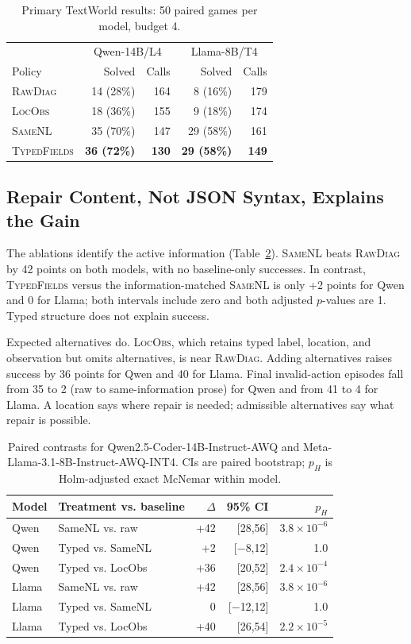 \documentclass[sigconf,review,anonymous]{acmart}
\newcommand{\rawdiag}{\textsc{RawDiag}\xspace}
\newcommand{\samenl}{\textsc{SameNL}\xspace}
\newcommand{\locobs}{\textsc{LocObs}\xspace}
\newcommand{\typedfields}{\textsc{TypedFields}\xspace}
\begin{document}
\begin{table}[t]
\caption{Primary TextWorld results: 50 paired games per model, budget 4.}
\label{tab:primary}
\small
\begin{tabular}{@{}lrrrr@{}}
\toprule
& \multicolumn{2}{c}{Qwen-14B/L4} & \multicolumn{2}{c}{Llama-8B/T4} \\
Policy & Solved & Calls & Solved & Calls \\
\midrule
\rawdiag & 14 (28\%) & 164 & 8 (16\%) & 179 \\
\locobs & 18 (36\%) & 155 & 9 (18\%) & 174 \\
\samenl & 35 (70\%) & 147 & 29 (58\%) & 161 \\
\typedfields & \textbf{36 (72\%)} & \textbf{130} & \textbf{29 (58\%)} & \textbf{149} \\
\bottomrule
\end{tabular}
\end{table}

\subsection{Repair Content, Not JSON Syntax, Explains the Gain}

The ablations identify the active information (Table~\ref{tab:causal}).
\samenl beats \rawdiag by 42 points on both models, with no baseline-only
successes. In contrast, \typedfields versus the information-matched \samenl is
only +2 points for Qwen and 0 for Llama; both intervals include zero and both
adjusted $p$-values are 1. Typed structure does not explain success.

Expected alternatives do. \locobs, which retains typed label, location, and
observation but omits alternatives, is near \rawdiag. Adding alternatives raises
success by 36 points for Qwen and 40 for Llama. Final invalid-action episodes
fall from 35 to 2 (raw to same-information prose) for Qwen and from 41 to 4 for
Llama. A location says where repair is needed; admissible alternatives say what
repair is possible.

\begin{table}[t]
\caption{Paired contrasts for Qwen2.5-Coder-14B-Instruct-AWQ and
Meta-Llama-3.1-8B-Instruct-AWQ-INT4. CIs are paired bootstrap; $p_H$ is
Holm-adjusted exact McNemar within model.}
\label{tab:causal}
\small
\begin{tabular}{@{}llrrr@{}}
\toprule
Model & Treatment vs. baseline & $\Delta$ & 95\% CI & $p_H$ \\
\midrule
Qwen & SameNL vs. raw & +42 & [28,56] & $3.8\!\times\!10^{-6}$ \\
Qwen & Typed vs. SameNL & +2 & [$-$8,12] & 1.0 \\
Qwen & Typed vs. LocObs & +36 & [20,52] & $2.4\!\times\!10^{-4}$ \\
Llama & SameNL vs. raw & +42 & [28,56] & $3.8\!\times\!10^{-6}$ \\
Llama & Typed vs. SameNL & 0 & [$-$12,12] & 1.0 \\
Llama & Typed vs. LocObs & +40 & [26,54] & $2.2\!\times\!10^{-5}$ \\
\bottomrule
\end{tabular}
\end{table}
\end{document}
